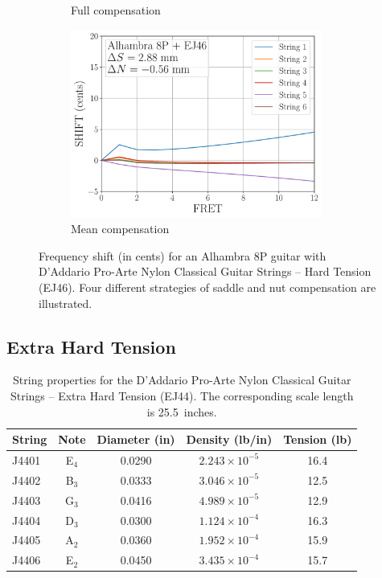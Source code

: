 \begin{figure}
\begin{subfigure}[b]{0.45\textwidth}
   \caption{Full compensation}
   \label{fig:shift_alhambra8p_ej46_full}
  \end{subfigure}
  \hspace{0.25in}
  \begin{subfigure}[b]{0.45\textwidth}
   \centering
   \includegraphics[width=3.25in]{figures/shift_alhambra8p_ej46_mean}
   \caption{Mean compensation}
   \label{fig:shift_alhambra8p_ej46_mean}
  \end{subfigure}
  \caption{\label{fig:compensation_alhambra8p_ej46} Frequency shift (in cents) for an Alhambra 8P guitar with D'Addario Pro-Arte Nylon Classical Guitar Strings -- Hard Tension (EJ46). Four different strategies of saddle and nut compensation are illustrated.}
 \end{figure}

 \newpage
 \subsection{Extra Hard Tension}

 \begin{table}[htbp]
  \centering
  \caption{\label{tbl:ej44_ips} String properties for the D'Addario Pro-Arte Nylon Classical Guitar Strings -- Extra Hard Tension (EJ44). The corresponding scale length is 25.5~inches.}
    \begin{tabular}{lcccc}
    \hline \hline
    String  & Note  & \multicolumn{1}{l}{Diameter (in)} & \multicolumn{1}{l}{Density (lb/in)} & \multicolumn{1}{l}{Tension (lb)} \\
    \hline
    J4401 & E$_4$  & 0.0290 & $2.243 \times 10^{-5}$ & 16.4 \\
    J4402 & B$_3$  & 0.0333 & $3.046 \times 10^{-5}$ & 12.5 \\
    J4403 & G$_3$  & 0.0416 & $4.989 \times 10^{-5}$ & 12.9 \\
    J4404 & D$_3$  & 0.0300 & $1.124 \times 10^{-4}$ & 16.3 \\
    J4405 & A$_2$  & 0.0360 & $1.952 \times 10^{-4}$ & 15.9 \\
    J4406 & E$_2$  & 0.0450 & $3.435 \times 10^{-4}$ & 15.7 \\
    \hline
    \end{tabular}%
 \end{table}%

